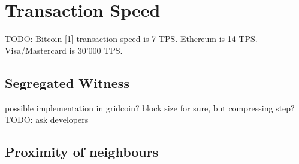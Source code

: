 \section{Transaction Speed}

TODO:
Bitcoin [1] transaction speed is 7 TPS. Ethereum is 14 TPS.
Visa/Mastercard is 30'000 TPS.

\subsection{Segregated Witness}
possible implementation in gridcoin? 
block size for sure, but compressing step?
TODO: ask developers

\subsection{Proximity of neighbours}

